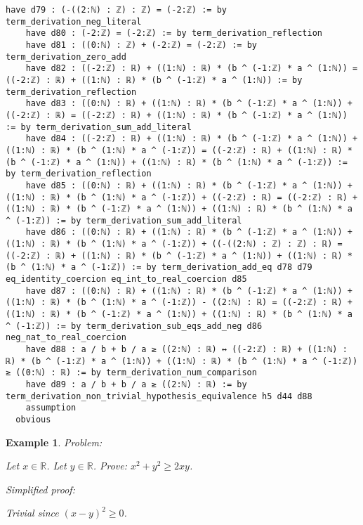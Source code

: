 \documentclass{article}
\newtheorem{example}{Example}
\begin{document}
\begin{tcolorbox}[colback=white!10, width=\linewidth]
\begin{lstlisting}[language=Lean4]
    have d79 : (-((2:ℕ) : ℤ) : ℤ) = (-2:ℤ) := by term_derivation_neg_literal
    have d80 : (-2:ℤ) = (-2:ℤ) := by term_derivation_reflection
    have d81 : ((0:ℕ) : ℤ) + (-2:ℤ) = (-2:ℤ) := by term_derivation_zero_add
    have d82 : ((-2:ℤ) : ℝ) + ((1:ℕ) : ℝ) * (b ^ (-1:ℤ) * a ^ (1:ℕ)) = ((-2:ℤ) : ℝ) + ((1:ℕ) : ℝ) * (b ^ (-1:ℤ) * a ^ (1:ℕ)) := by term_derivation_reflection
    have d83 : ((0:ℕ) : ℝ) + ((1:ℕ) : ℝ) * (b ^ (-1:ℤ) * a ^ (1:ℕ)) + ((-2:ℤ) : ℝ) = ((-2:ℤ) : ℝ) + ((1:ℕ) : ℝ) * (b ^ (-1:ℤ) * a ^ (1:ℕ)) := by term_derivation_sum_add_literal
    have d84 : ((-2:ℤ) : ℝ) + ((1:ℕ) : ℝ) * (b ^ (-1:ℤ) * a ^ (1:ℕ)) + ((1:ℕ) : ℝ) * (b ^ (1:ℕ) * a ^ (-1:ℤ)) = ((-2:ℤ) : ℝ) + ((1:ℕ) : ℝ) * (b ^ (-1:ℤ) * a ^ (1:ℕ)) + ((1:ℕ) : ℝ) * (b ^ (1:ℕ) * a ^ (-1:ℤ)) := by term_derivation_reflection
    have d85 : ((0:ℕ) : ℝ) + ((1:ℕ) : ℝ) * (b ^ (-1:ℤ) * a ^ (1:ℕ)) + ((1:ℕ) : ℝ) * (b ^ (1:ℕ) * a ^ (-1:ℤ)) + ((-2:ℤ) : ℝ) = ((-2:ℤ) : ℝ) + ((1:ℕ) : ℝ) * (b ^ (-1:ℤ) * a ^ (1:ℕ)) + ((1:ℕ) : ℝ) * (b ^ (1:ℕ) * a ^ (-1:ℤ)) := by term_derivation_sum_add_literal
    have d86 : ((0:ℕ) : ℝ) + ((1:ℕ) : ℝ) * (b ^ (-1:ℤ) * a ^ (1:ℕ)) + ((1:ℕ) : ℝ) * (b ^ (1:ℕ) * a ^ (-1:ℤ)) + ((-((2:ℕ) : ℤ) : ℤ) : ℝ) = ((-2:ℤ) : ℝ) + ((1:ℕ) : ℝ) * (b ^ (-1:ℤ) * a ^ (1:ℕ)) + ((1:ℕ) : ℝ) * (b ^ (1:ℕ) * a ^ (-1:ℤ)) := by term_derivation_add_eq d78 d79 eq_identity_coercion eq_int_to_real_coercion d85
    have d87 : ((0:ℕ) : ℝ) + ((1:ℕ) : ℝ) * (b ^ (-1:ℤ) * a ^ (1:ℕ)) + ((1:ℕ) : ℝ) * (b ^ (1:ℕ) * a ^ (-1:ℤ)) - ((2:ℕ) : ℝ) = ((-2:ℤ) : ℝ) + ((1:ℕ) : ℝ) * (b ^ (-1:ℤ) * a ^ (1:ℕ)) + ((1:ℕ) : ℝ) * (b ^ (1:ℕ) * a ^ (-1:ℤ)) := by term_derivation_sub_eqs_add_neg d86 neg_nat_to_real_coercion
    have d88 : a / b + b / a ≥ ((2:ℕ) : ℝ) ↔ ((-2:ℤ) : ℝ) + ((1:ℕ) : ℝ) * (b ^ (-1:ℤ) * a ^ (1:ℕ)) + ((1:ℕ) : ℝ) * (b ^ (1:ℕ) * a ^ (-1:ℤ)) ≥ ((0:ℕ) : ℝ) := by term_derivation_num_comparison
    have d89 : a / b + b / a ≥ ((2:ℕ) : ℝ) := by term_derivation_non_trivial_hypothesis_equivalence h5 d44 d88
    assumption
  obvious

\end{lstlisting}
\end{tcolorbox}


\begin{example}
Problem:
\begin{tcolorbox}[colback=yellow!10, width=\linewidth]
Let $x\in\mathbb{R}$. Let $y\in\mathbb{R}$.
    Prove: $x^2 + y^2 \ge 2xy$.
\end{tcolorbox}

Simplified proof:
\begin{tcolorbox}[colback=blue!10, width=\linewidth]
Trivial since $(x-y)^2 \ge 0$.
\end{tcolorbox}
\end{example}
\end{document}
